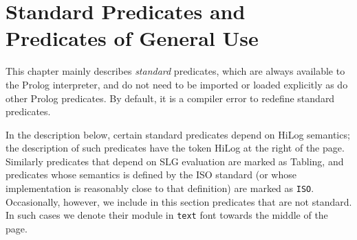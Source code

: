 \chapter[Standard and General Predicates]{Standard Predicates and Predicates of General Use} \label{standard}

This chapter mainly describes {\em standard} predicates, which are
always available to the Prolog interpreter, and do not need to be
imported or loaded explicitly as do other Prolog predicates.  By
default, it is a compiler error to redefine standard predicates.


In the description below, certain standard predicates depend on HiLog
semantics; the description of such predicates have the token {\sf
HiLog} at the right of the page.  Similarly predicates that depend on
SLG evaluation are marked as {\sf Tabling}, and predicates whose
semantics is defined by the ISO standard (or whose implementation is
reasonably close to that definition) are marked as {\tt ISO}.
Occasionally, however, we include in this section predicates that are
not standard.  In such cases we denote their module in {\tt text} font
towards the middle of the page.

